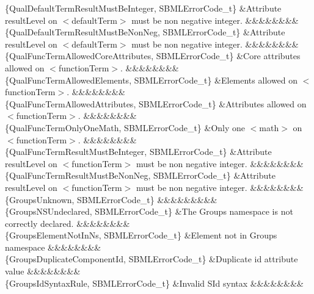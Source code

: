 \begin{DoxyParagraph}{}
\begin{longtabu}
\{Qual\+Default\+Term\+Result\+Must\+Be\+Integer, S\+B\+M\+L\+Error\+Code\+\_\+t\} &Attribute \textquotesingle{}result\+Level\textquotesingle{} on {\ttfamily $<$default\+Term$>$} must be non negative integer. &&&&&&&&\\
\{Qual\+Default\+Term\+Result\+Must\+Be\+Non\+Neg, S\+B\+M\+L\+Error\+Code\+\_\+t\} &Attribute \textquotesingle{}result\+Level\textquotesingle{} on {\ttfamily $<$default\+Term$>$} must be non negative integer. &&&&&&&&\\
\{Qual\+Func\+Term\+Allowed\+Core\+Attributes, S\+B\+M\+L\+Error\+Code\+\_\+t\} &Core attributes allowed on {\ttfamily $<$function\+Term$>$}. &&&&&&&&\\
\{Qual\+Func\+Term\+Allowed\+Elements, S\+B\+M\+L\+Error\+Code\+\_\+t\} &Elements allowed on {\ttfamily $<$function\+Term$>$}. &&&&&&&&\\
\{Qual\+Func\+Term\+Allowed\+Attributes, S\+B\+M\+L\+Error\+Code\+\_\+t\} &Attributes allowed on {\ttfamily $<$function\+Term$>$}. &&&&&&&&\\
\{Qual\+Func\+Term\+Only\+One\+Math, S\+B\+M\+L\+Error\+Code\+\_\+t\} &Only one {\ttfamily $<$math$>$} on {\ttfamily $<$function\+Term$>$}. &&&&&&&&\\
\{Qual\+Func\+Term\+Result\+Must\+Be\+Integer, S\+B\+M\+L\+Error\+Code\+\_\+t\} &Attribute \textquotesingle{}result\+Level\textquotesingle{} on {\ttfamily $<$function\+Term$>$} must be non negative integer. &&&&&&&&\\
\{Qual\+Func\+Term\+Result\+Must\+Be\+Non\+Neg, S\+B\+M\+L\+Error\+Code\+\_\+t\} &Attribute \textquotesingle{}result\+Level\textquotesingle{} on {\ttfamily $<$function\+Term$>$} must be non negative integer. &&&&&&&&\\
\{Groups\+Unknown, S\+B\+M\+L\+Error\+Code\+\_\+t\} &&&&&&&&&\\
\{Groups\+N\+S\+Undeclared, S\+B\+M\+L\+Error\+Code\+\_\+t\} &The Groups namespace is not correctly declared. &&&&&&&&\\
\{Groups\+Element\+Not\+In\+Ns, S\+B\+M\+L\+Error\+Code\+\_\+t\} &Element not in Groups namespace &&&&&&&&\\
\{Groups\+Duplicate\+Component\+Id, S\+B\+M\+L\+Error\+Code\+\_\+t\} &Duplicate \textquotesingle{}id\textquotesingle{} attribute value &&&&&&&&\\
\{Groups\+Id\+Syntax\+Rule, S\+B\+M\+L\+Error\+Code\+\_\+t\} &Invalid S\+Id syntax &&&&&&&&\\

\end{longtabu}
\end{DoxyParagraph}
